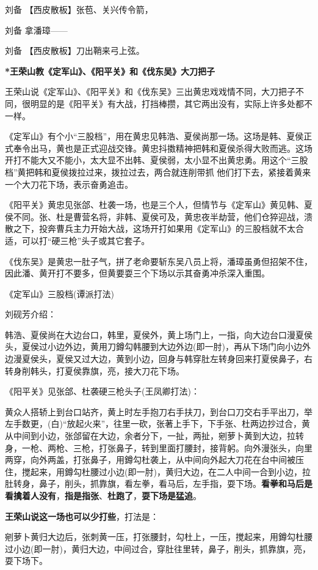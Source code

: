 刘备 【西皮散板】张苞、关兴传令箭，

刘备 拿潘璋------

刘备 【西皮散板】刀出鞘来弓上弦。

\textbf{*王荣山教《定军山》、《阳平关》和《伐东吴》大刀把子}

王荣山说《定军山》、《阳平关》和《伐东吴》三出黄忠戏戏情不同，大刀把子不同，很明显的是《阳平关》有大战，打挡棒攒，其它两出没有，实际上许多处都不一样。

《定军山》有个小``三股档''，用在黄忠见韩浩、夏侯尚那一场。这场是韩、夏侯正式奉令出马，黄也是正式迎战交锋。黄忠抖擞精神把韩和夏侯杀得大败而逃。这场开打不能大又不能小，太大显不出韩、夏侯弱，太小显不出黄忠勇。用这个``三股档''黄把韩和夏侯拨拉过来，拨拉过去，两合就连削带抓
他们打下去，紧接着黄来一个大刀花下场，表示奋勇追击。

《阳平关》黄忠见张郃、杜袭一场，也是三个人，但情节与《定军山》黄见韩、夏侯不同。张、杜是曹营名将，非韩、夏侯可及，黄忠夜半劫营，他们仓猝迎战，溃散之下，投奔曹兵主力开始大战，这场开打如果用《定军山》的三股档就不太合适，可以打``硬三枪''头子或其它套子。

《伐东吴》是黄忠一肚子气，拼了老命要斩东吴八员上将，潘璋虽勇但招架不住，因此潘、黄开打不要多，但黄要耍三个下场以示其奋勇冲杀深入重围。

《定军山》三股档(谭派打法)

刘砚芳介绍：

韩浩、夏侯尚在大边台口，韩里，夏侯外，黄上场门上，一指，向大边台口漫夏侯头，夏侯过小边外边，黄用刀鐏勾韩腰到大边外边(即一肘)，再从下场门向小边外边漫夏侯头，夏侯又过大边，黄到小边，回身与韩穿肚左转身回来打夏侯鼻子，右转身削韩头，打夏侯靠旗，亮，接大刀花下场。

《阳平关》见张郃、杜袭硬三枪头子(王凤卿打法)：

黄众人搭轿上到台口站齐，黄上时左手抱刀右手扶刀，到台口刀交右手平出刀，举左手数更，(白)``放起火来''，往里一砍，张著上手下，下手张、杜两边抄过合，黄从中间到小边，张郃留在大边，余者分下，一扯，两扯，剜萝卜黄到大边，拉转身，一枪、两枪、三枪，打张鼻子，转到里面打腰封，接背躬。向外漫张头，向里两穿，向外两盖，打张鼻子，用鐏勾杜袭上，从中间向外起大刀花在台中间被压住，搅起来，用鐏勾杜腰过小边(即一肘)，黄归大边，在二人中间一合到小边，拉肚转身，鼻子，削头，抓靠旗，看左拳，看马后，左手指，耍下场。\textbf{看拳和马后是看擒着人没有}，\textbf{指是指张}、\textbf{杜跑了}，\textbf{耍下场是猛追}。

\textbf{王荣山说这一场也可以少打些}，打法是：

剜萝卜黄归大边后，张刺黄一压，打张腰封，勾杜上，一压，搅起来，用鐏勾杜腰过小边(即一肘)，黄归大边，中间过合，穿肚往里转，鼻子，削头，抓靠旗，亮，耍下场下。

